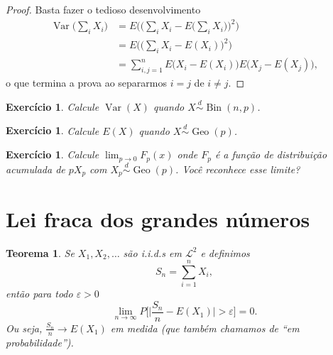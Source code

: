 \documentclass[reqno, draft]{book}
\newcommand*\1{\mathds{1}}
\newtheorem{theorem}{Teorema}[section]
\newtheorem{exercise}[example]{Exercício}
\DeclareMathOperator{\Var}{Var}
\DeclareMathOperator{\Geo}{Geo}
\DeclareMathOperator{\Bin}{Bin}
\begin{document}
\begin{proof}
  Basta fazer o tedioso desenvolvimento
  \begin{equation}
    \begin{split}
      \Var\Big(\sum_i X_i\Big) & = E \Big( \Big(\sum_i X_i - E\Big(\sum_i X_i\Big)\Big)^2\Big)\\
      & = E \Big( \Big(\sum_i X_i - E(X_i)\Big)^2\Big)\\
      & = \sum_{i, j = 1}^n E \big(X_i - E(X_i)\big) E\big(X_j - E(X_j)\big),
    \end{split}
  \end{equation}
  o que termina a prova ao separarmos $i = j$ de $i \neq j$.
\end{proof}

\begin{exercise}
  Calcule $\Var(X)$ quando $X \overset{d}\sim \Bin(n, p)$.
\end{exercise}

\begin{exercise}
  Calcule $E(X)$ quando $X \overset{d}\sim \Geo(p)$.
\end{exercise}

\begin{exercise}
  Calcule $\lim_{p \to 0} F_p(x)$ onde $F_p$ é a função de distribuição acumulada de $p X_p$ com $X_p \overset{d}\sim \Geo(p)$.
  Você reconhece esse limite?
\end{exercise}

\section{Lei fraca dos grandes números}


\begin{theorem}
  \label{t:lei_fraca}
  Se $X_1, X_2, \dots$ são i.i.d.s em $\mathcal{L}^2$ e definimos
  \begin{equation}
    S_n = \sum_{i=1}^n X_i,
  \end{equation}
  então para todo $\varepsilon > 0$
  \begin{equation}
    \lim_{n \to \infty} P \Big[\Big| \frac{S_n}{n} - E(X_1)\Big| > \varepsilon \Big] = 0.
  \end{equation}
  Ou seja, $\tfrac{S_n}{n} \to E(X_1)$ em medida (que também chamamos de ``em probabilidade'').
\end{theorem}
\end{document}
